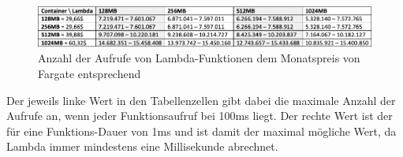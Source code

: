 \begin{figure}[H]
    \includegraphics[width=\textwidth]{img/lambda-max-invocations.png}
    \caption[Anzahl der Aufrufe von Lambda-Funktionen dem Monatspreis von Fargate entsprechend]{Anzahl der Aufrufe von Lambda-Funktionen dem Monatspreis von Fargate entsprechend}
    \label{fig:lambda-max-invocations}
\end{figure}

Der jeweils linke Wert in den Tabellenzellen gibt dabei die maximale Anzahl der Aufrufe an, wenn jeder Funktionsaufruf bei 100ms liegt. Der rechte Wert ist der für eine Funktions-Dauer von 1ms und ist damit der maximal mögliche Wert, da Lambda immer mindestens eine Millisekunde abrechnet.